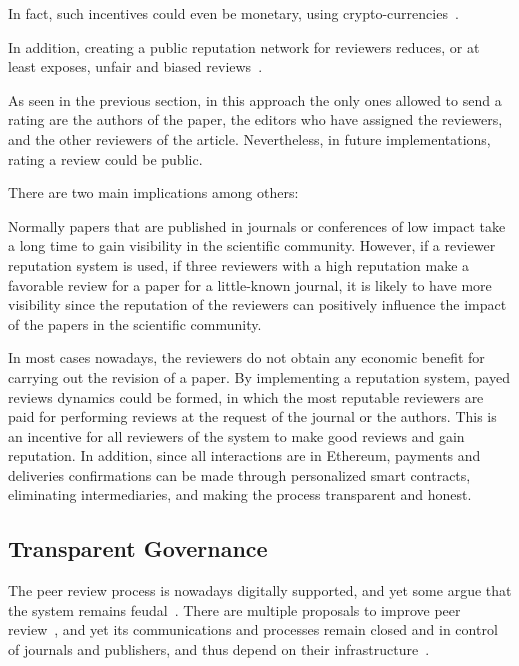In fact, such incentives could even be monetary, using
crypto-currencies~\cite{Jan:2018:SDC:3184558.3191556}.

In addition, creating a public reputation network for reviewers reduces, or at
least exposes, unfair and biased
reviews~\cite{wenneras2001nepotism,ReinventingSocioTech}.

As seen in the previous section, in this approach the only ones allowed to send
a rating are the authors of the paper, the editors who have assigned the
reviewers, and the other reviewers of the article. Nevertheless, in future
implementations, rating a review could be public.

There are two main implications among others:

\begin{itemize}
   Normally papers
  that are published in journals or conferences of low impact take a long time
  to gain visibility in the scientific community. However, if a reviewer
  reputation system is used, if three reviewers with a high reputation make a
  favorable review for a paper for a little-known journal, it is likely to have
  more visibility since the reputation of the reviewers can positively influence
  the impact of the papers in the scientific community.
  
   In most cases nowadays, the reviewers do not obtain any
  economic benefit for carrying out the revision of a paper. By implementing a
  reputation system, payed reviews dynamics could be formed, in which the most
  reputable reviewers are paid for performing reviews at the request of the
  journal or the authors. This is an incentive for all reviewers of the system
  to make good reviews and gain reputation. In addition, since all interactions
  are in Ethereum, payments and deliveries confirmations can be made through
  personalized smart contracts, eliminating intermediaries, and making the
  process transparent and honest.
 
\end{itemize}

\subsection{Transparent Governance}
\label{sec:transp-govern}

The peer review process is nowadays digitally supported, and yet some argue that
the system remains feudal~\cite{ReinventingRigor}. There are multiple proposals
to improve peer review~\cite{walker_emerging_2015}, and yet its communications
and processes remain closed and in control of journals and publishers, and thus
depend on their infrastructure~\cite{ReinventingSocioTech}.

